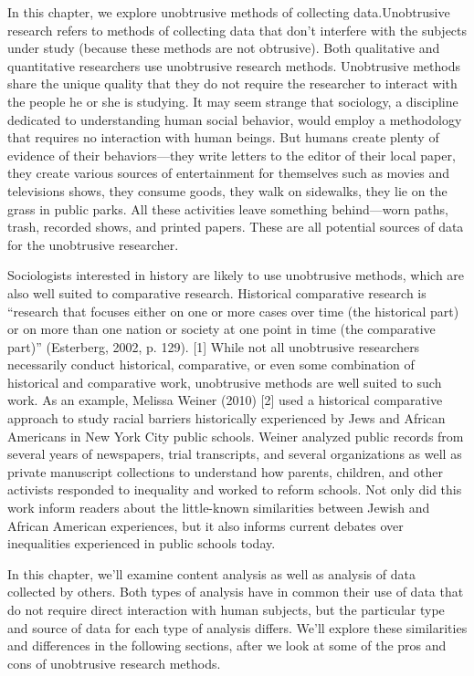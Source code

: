 In this chapter, we explore unobtrusive methods of collecting data.Unobtrusive research refers to methods of collecting data that don’t interfere with the subjects under study (because these methods are not obtrusive). Both qualitative and quantitative researchers use unobtrusive research methods. Unobtrusive methods share the unique quality that they do not require the researcher to interact with the people he or she is studying. It may seem strange that sociology, a discipline dedicated to understanding human social behavior, would employ a methodology that requires no interaction with human beings. But humans create plenty of evidence of their behaviors—they write letters to the editor of their local paper, they create various sources of entertainment for themselves such as movies and televisions shows, they consume goods, they walk on sidewalks, they lie on the grass in public parks. All these activities leave something behind—worn paths, trash, recorded shows, and printed papers. These are all potential sources of data for the unobtrusive researcher.

Sociologists interested in history are likely to use unobtrusive methods, which are also well suited to comparative research. Historical comparative research is “research that focuses either on one or more cases over time (the historical part) or on more than one nation or society at one point in time (the comparative part)” (Esterberg, 2002, p. 129). [1] While not all unobtrusive researchers necessarily conduct historical, comparative, or even some combination of historical and comparative work, unobtrusive methods are well suited to such work. As an example, Melissa Weiner (2010) [2] used a historical comparative approach to study racial barriers historically experienced by Jews and African Americans in New York City public schools. Weiner analyzed public records from several years of newspapers, trial transcripts, and several organizations as well as private manuscript collections to understand how parents, children, and other activists responded to inequality and worked to reform schools. Not only did this work inform readers about the little-known similarities between Jewish and African American experiences, but it also informs current debates over inequalities experienced in public schools today.

In this chapter, we’ll examine content analysis as well as analysis of data collected by others. Both types of analysis have in common their use of data that do not require direct interaction with human subjects, but the particular type and source of data for each type of analysis differs. We’ll explore these similarities and differences in the following sections, after we look at some of the pros and cons of unobtrusive research methods.

